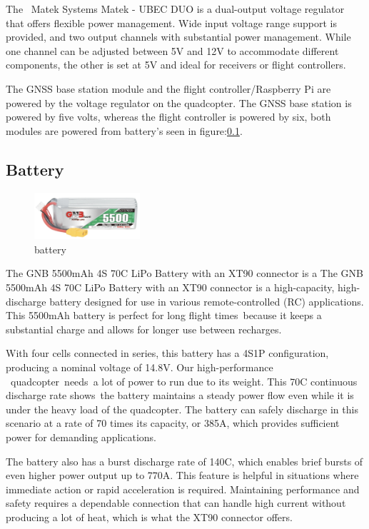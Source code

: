 \documentclass{article}
\begin{document}
The  Matek Systems Matek - UBEC DUO is a dual-output voltage regulator that offers flexible power management. Wide input voltage range support is provided, and two output channels with substantial power management. While one channel can be adjusted between 5V and 12V to accommodate different components, the other is 
set at 5V and ideal for receivers or flight controllers.

The GNSS base station module and the flight controller/Raspberry Pi are powered by the voltage regulator on the quadcopter. The GNSS base station is powered by five volts, whereas the flight controller is powered by six, both modules are powered from battery's seen in figure:\ref{battery}.

\subsection{Battery}\label{battery}
\begin{figure}[H]
  \centering
  \includegraphics[width=0.35\textwidth]{Pictures/battery.png}
  \caption{battery}
  \label{fig:battery}
\end{figure}
The GNB 5500mAh 4S 70C LiPo Battery with an XT90 connector is a The GNB 5500mAh 4S 70C LiPo Battery with an XT90 connector is a high-capacity, high-discharge battery designed for use in various remote-controlled (RC) applications. This 5500mAh battery is perfect for long flight times because it keeps a substantial charge and allows for longer use 
between recharges.

With four cells connected in series, this battery has a 4S1P configuration, producing a nominal voltage of 14.8V. Our high-performance  quadcopter needs a lot of power to run due to its weight. This 70C continuous discharge rate shows the battery maintains a steady power flow even while it is under the heavy load of the quadcopter. The battery can 
safely discharge in this scenario at a rate of 70 times its capacity, or 385A, which provides sufficient power for demanding applications.

The battery also has a burst discharge rate of 140C, which enables brief bursts of even higher power output up to 770A. This feature is helpful in situations where immediate action or rapid acceleration is required. Maintaining performance and safety requires a dependable connection that can handle high current without producing a lot of heat, 
which is what the XT90 connector offers.
\end{document}
